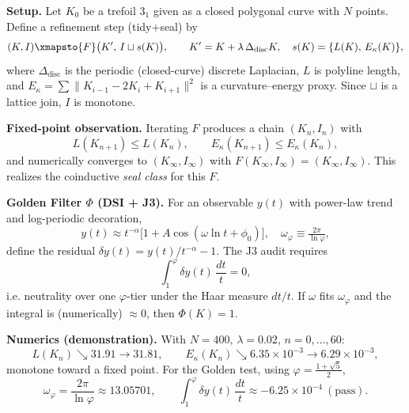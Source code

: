             \noindent
            \textbf{Setup.} Let \(K_0\) be a trefoil \(3_1\) given as a closed polygonal curve with \(N\) points.
            Define a refinement step (tidy\(+\)seal) by
            \[
                (K,I) \xmapsto{F} \bigl(K',\, I \sqcup s(K)\bigr),\qquad
                K' = K + \lambda\,\Delta_{\text{disc}}K,\quad
                s(K)=\{L(K),\,E_\kappa(K)\},
            \]
            where \(\Delta_{\text{disc}}\) is the periodic (closed-curve) discrete Laplacian,
            \(L\) is polyline length, and \(E_\kappa=\sum \lVert K_{i-1}-2K_i+K_{i+1}\rVert^2\) is a curvature–energy proxy.
            Since \(\sqcup\) is a lattice join, \(I\) is monotone.

            \medskip
            \noindent
            \textbf{Fixed-point observation.} Iterating \(F\) produces a chain \((K_n,I_n)\) with
            \[
                L(K_{n+1})\le L(K_n),\qquad E_\kappa(K_{n+1})\le E_\kappa(K_n),
            \]
            and numerically converges to \((K_\infty,I_\infty)\) with
            \(F(K_\infty,I_\infty)=(K_\infty,I_\infty)\). This realizes the coinductive
            \emph{seal class} for this \(F\).

            \medskip
            \noindent
            \textbf{Golden Filter \(\Phi\) (DSI + J3).} For an observable \(y(t)\) with power-law trend
            and log-periodic decoration,
            \[
                y(t)\approx t^{-\alpha}\bigl[1+A\cos(\omega\ln t+\phi_0)\bigr],
                \quad
                \omega_\varphi \equiv \tfrac{2\pi}{\ln\varphi},
            \]
            define the residual \(\delta y(t) = y(t)/t^{-\alpha}-1\).
            The J3 audit requires
            \[
                \int_{1}^{\varphi}\delta y(t)\,\frac{dt}{t}=0,
            \]
            i.e. neutrality over one \(\varphi\)-tier under the Haar measure \(dt/t\).
            If \(\omega\) fits \(\omega_\varphi\) and the integral is (numerically) \(\approx 0\), then \(\Phi(K)=1\).

            \medskip
            \noindent
            \textbf{Numerics (demonstration).}
            With \(N=400\), \(\lambda=0.02\), \(n=0,\dots,60\):
            \[
                L(K_n)\searrow 31.91\rightarrow 31.81,\qquad
                E_\kappa(K_n)\searrow 6.35\!\times\!10^{-3}\rightarrow 6.29\!\times\!10^{-3},
            \]
            monotone toward a fixed point.
            For the Golden test, using \(\varphi=\tfrac{1+\sqrt{5}}{2}\),
            \[
                \omega_\varphi=\frac{2\pi}{\ln\varphi}\approx 13.05701,
                \qquad
                \int_{1}^{\varphi}\delta y(t)\,\frac{dt}{t}\approx -6.25\times10^{-4}\ (\text{pass}).
            \]

